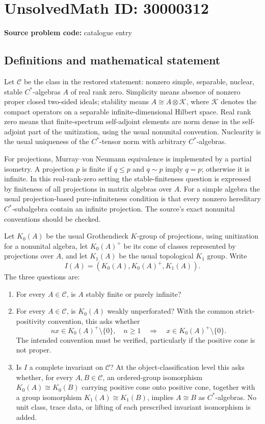 \documentclass[11pt]{article}
\begin{document}
\section*{UnsolvedMath ID: 30000312}
\textbf{Source problem code:} catalogue entry
\subsection{Definitions and mathematical statement}
Let $\mathcal C$ be the class in the restored statement: nonzero simple, separable, nuclear, stable $C^*$-algebras $A$ of real rank zero. Simplicity means absence of nonzero proper closed two-sided ideals; stability means $A\cong A\otimes\mathcal K$, where $\mathcal K$ denotes the compact operators on a separable infinite-dimensional Hilbert space. Real rank zero means that finite-spectrum self-adjoint elements are norm dense in the self-adjoint part of the unitization, using the usual nonunital convention. Nuclearity is the usual uniqueness of the $C^*$-tensor norm with arbitrary $C^*$-algebras.

For projections, Murray--von Neumann equivalence is implemented by a partial isometry. A projection $p$ is finite if $q\le p$ and $q\sim p$ imply $q=p$; otherwise it is infinite. In this real-rank-zero setting the stable-finiteness question is expressed by finiteness of all projections in matrix algebras over $A$. For a simple algebra the usual projection-based pure-infiniteness condition is that every nonzero hereditary $C^*$-subalgebra contain an infinite projection. The source's exact nonunital conventions should be checked.

Let $K_0(A)$ be the usual Grothendieck $K$-group of projections, using unitization for a nonunital algebra, let $K_0(A)^+$ be its cone of classes represented by projections over $A$, and let $K_1(A)$ be the usual topological $K_1$ group. Write
\[
 I(A)=(K_0(A),K_0(A)^+,K_1(A)).
\]
The three questions are:
\begin{enumerate}
\item For every $A\in\mathcal C$, is $A$ stably finite or purely infinite?
\item For every $A\in\mathcal C$, is $K_0(A)$ weakly unperforated? With the common strict-positivity convention, this asks whether
\[
 nx\in K_0(A)^+\setminus\{0\},\quad n\ge1
 \quad\Longrightarrow\quad x\in K_0(A)^+\setminus\{0\}.
\]
The intended convention must be verified, particularly if the positive cone is not proper.
\item Is $I$ a complete invariant on $\mathcal C$? At the object-classification level this asks whether, for every $A,B\in\mathcal C$, an ordered-group isomorphism $K_0(A)\cong K_0(B)$ carrying positive cone onto positive cone, together with a group isomorphism $K_1(A)\cong K_1(B)$, implies $A\cong B$ as $C^*$-algebras. No unit class, trace data, or lifting of each prescribed invariant isomorphism is added.
\end{enumerate}
\end{document}
